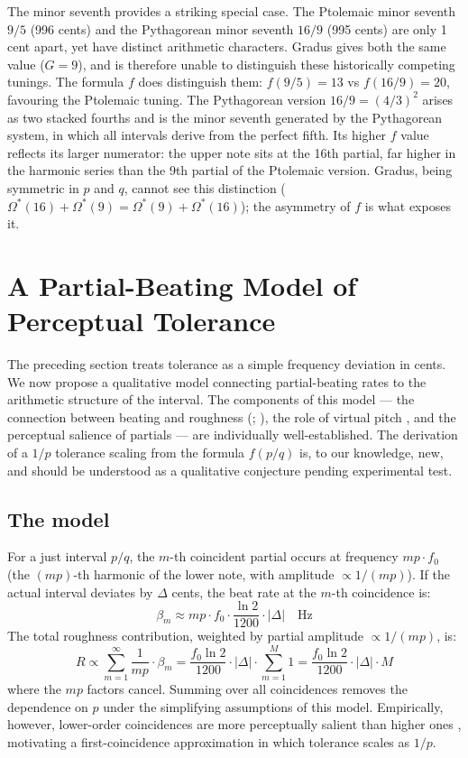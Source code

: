 \documentclass[11pt,a4paper]{article}
\newcommand{\Os}{\Omega^{\!*}}
\begin{document}
The minor seventh provides a striking special case. The Ptolemaic minor
seventh $9/5$ (996 cents) and the Pythagorean minor seventh $16/9$ (995
cents) are only 1 cent apart, yet have distinct arithmetic characters.
Gradus gives both the same value ($G = 9$), and is therefore unable to
distinguish these historically competing tunings. The formula $f$ does
distinguish them: $f(9/5) = 13$ vs $f(16/9) = 20$, favouring the Ptolemaic
tuning. The Pythagorean version $16/9 = (4/3)^2$ arises as two stacked fourths and
is the minor seventh generated by the Pythagorean system, in which all
intervals derive from the perfect fifth. Its higher $f$ value reflects its
larger numerator: the upper note sits at the 16th partial, far higher in the
harmonic series than the 9th partial of the Ptolemaic version. Gradus, being
symmetric in $p$ and $q$, cannot see this distinction ($\Os(16) + \Os(9) =
\Os(9) + \Os(16)$); the asymmetry of $f$ is what exposes it.


\section{A Partial-Beating Model of Perceptual Tolerance}

The preceding section treats tolerance as a simple frequency deviation in
cents. We now propose a qualitative model connecting partial-beating rates to
the arithmetic structure of the interval. The components of this model ---
the connection between beating and roughness (\cite{helmholtz1863};
\cite{plomplevelt1965}), the role of virtual pitch \cite{terhardt1979}, and
the perceptual salience of partials \cite{parncutt1988} --- are individually
well-established. The derivation of a $1/p$ tolerance scaling from the formula
$f(p/q)$ is, to our knowledge, new, and should be understood as a
qualitative conjecture pending experimental test.

\subsection*{The model}

For a just interval $p/q$, the $m$-th coincident partial occurs at frequency
$mp \cdot f_0$ (the $(mp)$-th harmonic of the lower note, with amplitude
$\propto 1/(mp)$). If the actual interval deviates by $\Delta$ cents, the
beat rate at the $m$-th coincidence is:
\[
  \beta_m \approx mp \cdot f_0 \cdot \frac{\ln 2}{1200} \cdot |\Delta|
  \quad \text{Hz}
\]
The total roughness contribution, weighted by partial amplitude $\propto
1/(mp)$, is:
\[
  R \propto \sum_{m=1}^{\infty} \frac{1}{mp} \cdot \beta_m
  = \frac{f_0 \ln 2}{1200} \cdot |\Delta| \cdot \sum_{m=1}^{M} 1
  = \frac{f_0 \ln 2}{1200} \cdot |\Delta| \cdot M
\]
where the $mp$ factors cancel. Summing over all coincidences removes the dependence on $p$ under the
simplifying assumptions of this model. Empirically, however, lower-order
coincidences are more perceptually salient than higher ones
\cite{terhardt1979,parncutt1988}, motivating a first-coincidence
approximation in which tolerance scales as $1/p$.
\end{document}
